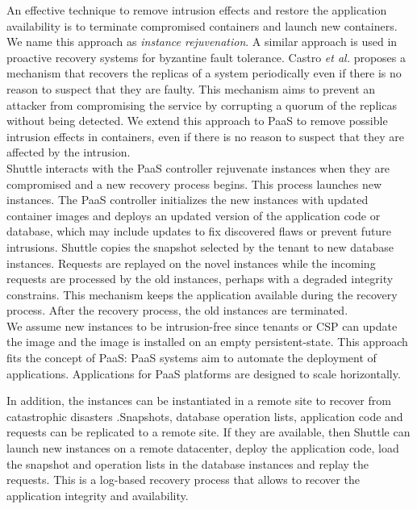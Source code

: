 An effective technique to remove intrusion effects and restore the application availability is to terminate compromised containers and launch new containers. We name this approach as \textit{instance rejuvenation}. A similar approach is used in proactive recovery systems for byzantine fault tolerance. Castro \textit{et al.} \cite{Castro2002} proposes a mechanism that recovers the replicas of a system periodically even if there is no reason to suspect that they are faulty. This mechanism aims to prevent an attacker from compromising the service by corrupting a quorum of the replicas without being detected. We extend this approach to \ac{PaaS} to remove possible intrusion effects in containers, even if there is no reason to suspect that they are affected by the intrusion.\\



Shuttle interacts with the \ac{PaaS} controller rejuvenate instances when they are compromised and a new recovery process begins. This process launches new instances. The \ac{PaaS} controller initializes the new instances with updated container images and deploys an updated version of the application code or database, which may include updates to fix discovered flaws or prevent future intrusions. Shuttle copies the snapshot selected by the tenant to new database instances. Requests are replayed on the novel instances while the incoming requests are processed by the old instances, perhaps with a degraded integrity constrains. This mechanism keeps the application available during the recovery process. After the recovery process, the old instances are terminated.\\

We assume new instances to be intrusion-free since tenants or \acf{CSP} can update the image and the image is installed on an empty persistent-state. This approach fits the concept of \ac{PaaS}: \ac{PaaS} systems aim to automate the deployment of applications. Applications for \ac{PaaS} platforms are designed to scale horizontally.

In addition, the instances can be instantiated in a remote site to recover from catastrophic disasters \cite{cloud-disaster}.Snapshots, database operation lists, application code and requests can be replicated to a remote site. If they are available, then Shuttle can launch new instances on a remote datacenter, deploy the application code, load the snapshot and operation lists in the database instances and replay the requests. This is a log-based recovery process \cite{Wang2010} that allows to recover the  application integrity and availability.

